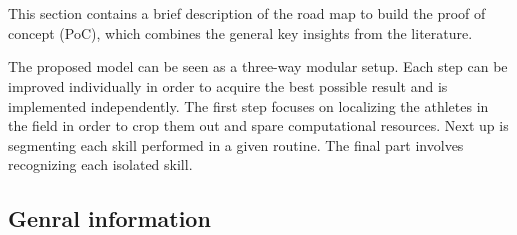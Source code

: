 
\chapter{}%
\label{ch:methodologie}


This section contains a brief description of the road map to build the proof of concept (PoC), which combines the general key insights from the literature.

The proposed model can be seen as a three-way modular setup. Each step can be improved individually in order to acquire the best possible result and is implemented independently.
The first step focuses on localizing the athletes in the field in order to crop them out and spare computational resources. Next up is segmenting each skill performed in a given routine. The final part involves recognizing each isolated skill.


\section{Genral information}

